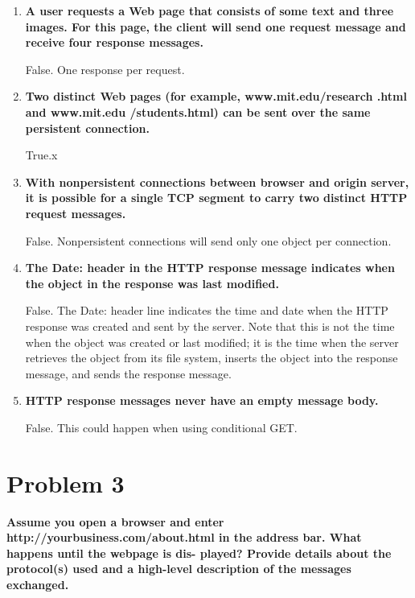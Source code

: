 \documentclass[11pt]{article}
\newenvironment{qparts}{\begin{enumerate}[{(}a{)}]}{\end{enumerate}}
\begin{document}
\begin{qparts}

	\item \textbf{A user requests a Web page that consists of some text and three images. For this page, the client will send one request message and receive four response messages.}
	
	False. One response per request.
	
	\item \textbf{Two distinct Web pages (for example, www.mit.edu/research .html and www.mit.edu /students.html) can be sent over the same persistent connection.}

	True.x
	
	\item \textbf{With nonpersistent connections between browser and origin server, it is possible for a single TCP segment to carry two distinct HTTP request messages.}
	
	False. Nonpersistent connections will send only one object per connection.
	
	\item \textbf{The Date: header in the HTTP response message indicates when the object in the response was last modified.}
	
	False. The Date: header line indicates the time and date when the HTTP response was created and sent by the server. Note that this is not the time when the object was created or last modified; it is the time when the server retrieves the object from its file system, inserts the object into the response message, and sends the response message. 
	
	\item \textbf{HTTP response messages never have an empty message body.}

	False. This could happen when using conditional GET.

\end{qparts}


\newpage
\section{Problem 3}

\textbf{Assume you open a browser and enter http://yourbusiness.com/about.html in the address bar. What happens until the webpage is dis- played? Provide details about the protocol(s) used and a high-level description of the messages exchanged.}

~\\
\end{document}
